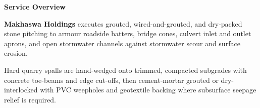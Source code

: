 \documentclass[a4paper,11pt]{article}
\begin{document}
\noindent
\begin{minipage}[t]{0.63\textwidth}
    \vspace{0pt}
    {\large\bfseries\color{mhnavy} Service Overview}
    \vspace{0.08cm}

    {\fontsize{8.7pt}{12.3pt}\selectfont\color{mhtext}
    \textbf{Makhaswa Holdings} executes grouted, wired-and-grouted, and dry-packed stone pitching to armour roadside batters, bridge cones, culvert inlet and outlet aprons, and open stormwater channels against stormwater scour and surface erosion.
    }

    \vspace{0.15cm}

    {\fontsize{8.7pt}{12.3pt}\selectfont\color{mhtext}
    Hard quarry spalls are hand-wedged onto trimmed, compacted subgrades with concrete toe-beams and edge cut-offs, then cement-mortar grouted or dry-interlocked with PVC weepholes and geotextile backing where subsurface seepage relief is required.
    }
\end{minipage}
\hfill
\end{document}
